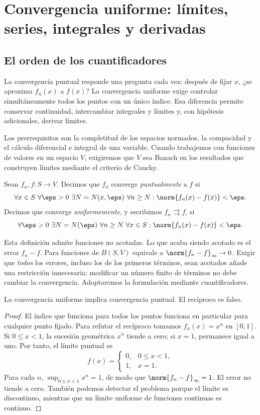 \chapter{Convergencia uniforme: límites, series, integrales y derivadas}\label{chap:26}

\section{El orden de los cuantificadores}
La convergencia puntual responde una pregunta cada vez: después de fijar $x$, ¿se aproxima $f_n(x)$ a $f(x)$? La convergencia uniforme exige controlar simultáneamente todos los puntos con un único índice. Esa diferencia permite conservar continuidad, intercambiar integrales y límites y, con hipótesis adicionales, derivar límites.

Los prerrequisitos son la completitud de los espacios normados, la compacidad y el cálculo diferencial e integral de una variable. Cuando trabajemos con funciones de valores en un espacio $V$, exigiremos que $V$ sea Banach en los resultados que construyen límites mediante el criterio de Cauchy.

\begin{definicion}
Sean $f_n,f:S\to V$. Decimos que $f_n$ converge \emph{puntualmente} a $f$ si
\[
 \forall x\in S\ \forall\eps>0\ \exists N=N(x,\eps)\ \forall n\ge N:
 \norm{f_n(x)-f(x)}<\eps.
\]
Decimos que converge \emph{uniformemente}, y escribimos $f_n\rightrightarrows f$, si
\[
 \forall\eps>0\ \exists N=N(\eps)\ \forall n\ge N\ \forall x\in S:
 \norm{f_n(x)-f(x)}<\eps.
\]
\end{definicion}

Esta definición admite funciones no acotadas. Lo que acaba siendo acotado es el error $f_n-f$. Para funciones de $B(S,V)$ equivale a $\norm{f_n-f}_\infty\to0$. Exigir que \emph{todos} los errores, incluso los de los primeros términos, sean acotados añade una restricción innecesaria: modificar un número finito de términos no debe cambiar la convergencia. Adoptaremos la formulación mediante cuantificadores.

\begin{proposicion}
La convergencia uniforme implica convergencia puntual. El recíproco es falso.
\end{proposicion}
\begin{proof}
El índice que funciona para todos los puntos funciona en particular para cualquier punto fijado. Para refutar el recíproco tomamos $f_n(x)=x^n$ en $[0,1]$. Si $0\le x<1$, la sucesión geométrica $x^n$ tiende a cero; si $x=1$, permanece igual a uno. Por tanto, el límite puntual es
\[
 f(x)=\begin{cases}0,&0\le x<1,\\1,&x=1.\end{cases}
\]
Para cada $n$, $\sup_{0\le x<1}x^n=1$, de modo que $\norm{f_n-f}_\infty=1$. El error no tiende a cero. También podemos detectar el problema porque el límite es discontinuo, mientras que un límite uniforme de funciones continuas es continuo.
\end{proof}

